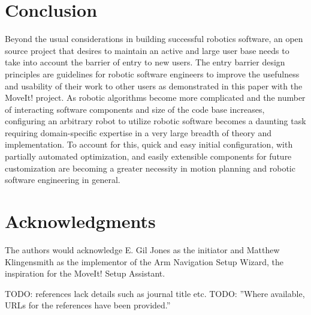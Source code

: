 \documentclass[10pt,journal,compsoc]{joser1}
\begin{document}
{%
\section{Conclusion}
\label{sec::conclusion}

Beyond the usual considerations in building successful robotics software, an open source project that desires to maintain an active and large user base needs to take into account the barrier of entry to new users. The entry barrier design principles are guidelines for robotic software engineers to improve the usefulness and usability of their work to other users as demonstrated in this paper with the MoveIt! project. As robotic algorithms become more complicated and the number of interacting software components and size of the code base increases, configuring an arbitrary robot to utilize robotic software becomes a daunting task requiring domain-specific expertise in a very large breadth of theory and implementation. To account for this, quick and easy initial configuration, with partially automated optimization, and easily extensible components for future customization are becoming a greater necessity in motion planning and robotic software engineering in general. 

\section*{Acknowledgments}
The authors would acknowledge E. Gil Jones as the initiator and Matthew Klingensmith as the implementor of the Arm Navigation Setup Wizard, the inspiration for the MoveIt! Setup Assistant.

TODO: references lack details such as journal title etc. 
TODO: ''Where available, URLs for the references have been provided.''




}
\end{document}
